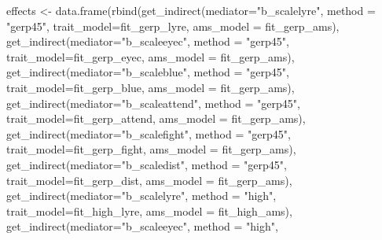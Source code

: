 \documentclass[
  letterpaper,
  DIV=11,
  numbers=noendperiod]{scrreprt}
\newenvironment{Shaded}{}{}
\newcommand{\AttributeTok}[1]{\textcolor[rgb]{0.84,0.23,0.29}{#1}}
\newcommand{\FunctionTok}[1]{\textcolor[rgb]{0.44,0.26,0.76}{#1}}
\newcommand{\NormalTok}[1]{\textcolor[rgb]{0.14,0.16,0.18}{#1}}
\newcommand{\OtherTok}[1]{\textcolor[rgb]{0.44,0.26,0.76}{#1}}
\newcommand{\StringTok}[1]{\textcolor[rgb]{0.01,0.18,0.38}{#1}}
\begin{document}
\begin{Shaded}
\begin{Highlighting}[]
\NormalTok{effects }\OtherTok{\textless{}{-}} \FunctionTok{data.frame}\NormalTok{(}\FunctionTok{rbind}\NormalTok{(}\FunctionTok{get\_indirect}\NormalTok{(}\AttributeTok{mediator=}\StringTok{"b\_scalelyre"}\NormalTok{, }\AttributeTok{method =} \StringTok{"gerp45"}\NormalTok{, }
                                         \AttributeTok{trait\_model=}\NormalTok{fit\_gerp\_lyre, }\AttributeTok{ams\_model =}\NormalTok{ fit\_gerp\_ams),}
                            \FunctionTok{get\_indirect}\NormalTok{(}\AttributeTok{mediator=}\StringTok{"b\_scaleeyec"}\NormalTok{,  }\AttributeTok{method =} \StringTok{"gerp45"}\NormalTok{, }
                                         \AttributeTok{trait\_model=}\NormalTok{fit\_gerp\_eyec, }\AttributeTok{ams\_model =}\NormalTok{ fit\_gerp\_ams),}
                            \FunctionTok{get\_indirect}\NormalTok{(}\AttributeTok{mediator=}\StringTok{"b\_scaleblue"}\NormalTok{,  }\AttributeTok{method =} \StringTok{"gerp45"}\NormalTok{, }
                                         \AttributeTok{trait\_model=}\NormalTok{fit\_gerp\_blue, }\AttributeTok{ams\_model =}\NormalTok{ fit\_gerp\_ams),}
                            \FunctionTok{get\_indirect}\NormalTok{(}\AttributeTok{mediator=}\StringTok{"b\_scaleattend"}\NormalTok{,  }\AttributeTok{method =} \StringTok{"gerp45"}\NormalTok{, }
                                         \AttributeTok{trait\_model=}\NormalTok{fit\_gerp\_attend, }\AttributeTok{ams\_model =}\NormalTok{ fit\_gerp\_ams),}
                            \FunctionTok{get\_indirect}\NormalTok{(}\AttributeTok{mediator=}\StringTok{"b\_scalefight"}\NormalTok{,  }\AttributeTok{method =} \StringTok{"gerp45"}\NormalTok{, }
                                         \AttributeTok{trait\_model=}\NormalTok{fit\_gerp\_fight, }\AttributeTok{ams\_model =}\NormalTok{ fit\_gerp\_ams),}
                            \FunctionTok{get\_indirect}\NormalTok{(}\AttributeTok{mediator=}\StringTok{"b\_scaledist"}\NormalTok{,  }\AttributeTok{method =} \StringTok{"gerp45"}\NormalTok{, }
                                         \AttributeTok{trait\_model=}\NormalTok{fit\_gerp\_dist, }\AttributeTok{ams\_model =}\NormalTok{ fit\_gerp\_ams),}
                            \FunctionTok{get\_indirect}\NormalTok{(}\AttributeTok{mediator=}\StringTok{"b\_scalelyre"}\NormalTok{, }\AttributeTok{method =} \StringTok{"high"}\NormalTok{, }
                                         \AttributeTok{trait\_model=}\NormalTok{fit\_high\_lyre, }\AttributeTok{ams\_model =}\NormalTok{ fit\_high\_ams),}
                            \FunctionTok{get\_indirect}\NormalTok{(}\AttributeTok{mediator=}\StringTok{"b\_scaleeyec"}\NormalTok{,  }\AttributeTok{method =} \StringTok{"high"}\NormalTok{, }

\end{Highlighting}
\end{Shaded}
\end{document}
